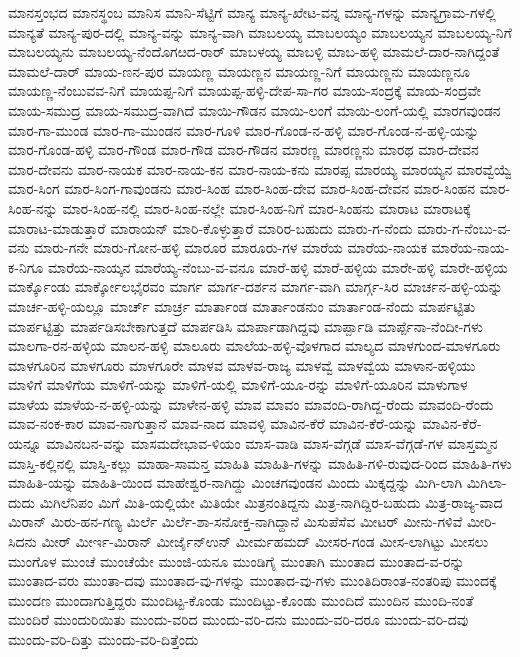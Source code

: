 {ಮಾನಸ್ತಂಭದ
ಮಾನಸ್ಥಂಬ
ಮಾನಿಸ
ಮಾನಿ-ಸೆಟ್ಟಿಗೆ
ಮಾನ್ಯ
ಮಾನ್ಯ-ಖೇಟ-ವನ್ನ
ಮಾನ್ಯ-ಗಳನ್ನು
ಮಾನ್ಯಗ್ರಾಮ-ಗಳಲ್ಲಿ
ಮಾನ್ಯತೆ
ಮಾನ್ಯ-ಪುರ-ದಲ್ಲಿ
ಮಾನ್ಯ-ವನ್ನು
ಮಾನ್ಯ-ವಾಗಿ
ಮಾಬಲಯ್ಯ
ಮಾಬಲಯ್ಯಂ
ಮಾಬಲಯ್ಯನ
ಮಾಬಲಯ್ಯ-ನಿಗೆ
ಮಾಬಲಯ್ಯನು
ಮಾಬಲಯ್ಯ-ನೆಂದೊಗೞದ-ರಾರ್
ಮಾಬಳಯ್ಯ
ಮಾಬಳ್ಳಿ
ಮಾಬ-ಹಳ್ಳಿ
ಮಾಮಲೆ-ದಾರ-ನಾಗಿದ್ದಂತೆ
ಮಾಮಲೆ-ದಾರ್
ಮಾಯ-ಣನ-ಪುರ
ಮಾಯಣ್ಣ
ಮಾಯಣ್ಣನ
ಮಾಯಣ್ಣ-ನಿಗೆ
ಮಾಯಣ್ಣನು
ಮಾಯಣ್ಣನೂ
ಮಾಯಣ್ಣ-ನೆಂಬುವವ-ನಿಗೆ
ಮಾಯಪ್ಪ-ನಿಗೆ
ಮಾಯಪ್ಪ-ಹಳ್ಳಿ-ದೇಪ-ಸಾ-ಗರ
ಮಾಯ-ಸಂದ್ರಕ್ಕೆ
ಮಾಯ-ಸಂದ್ರವೇ
ಮಾಯ-ಸಮುದ್ರ
ಮಾಯ-ಸಮುದ್ರ-ವಾಗಿದೆ
ಮಾಯಿ-ಗೌಡನ
ಮಾಯಿ-ಲಂಗೆ
ಮಾಯಿ-ಲಂಗೆ-ಯಲ್ಲಿ
ಮಾರಗವುಂಡನ
ಮಾರ-ಗಾ-ಮುಂಡ
ಮಾರ-ಗಾ-ಮುಂಡನ
ಮಾರ-ಗೂಳಿ
ಮಾರ-ಗೊಂಡ-ನ-ಹಳ್ಳಿ
ಮಾರ-ಗೊಂಡ-ನ-ಹಳ್ಳಿ-ಯನ್ನು
ಮಾರ-ಗೊಂಡ-ಹಳ್ಳಿ
ಮಾರ-ಗೌಂಡ
ಮಾರ-ಗೌಡ
ಮಾರ-ಗೌಡನ
ಮಾರಣ್ಣ
ಮಾರಣ್ಣನು
ಮಾರಥ
ಮಾರ-ದೇವನ
ಮಾರ-ದೇವನು
ಮಾರ-ನಾಯಕ
ಮಾರ-ನಾಯ-ಕನ
ಮಾರ-ನಾಯ-ಕನು
ಮಾರಪ್ಪ
ಮಾರಯ್ಯ
ಮಾರಯ್ಯನ
ಮಾರವ್ವೆಯ್ವೆ
ಮಾರ-ಸಿಂಗ
ಮಾರ-ಸಿಂಗ-ಗಾವುಂಡನು
ಮಾರ-ಸಿಂಹ
ಮಾರ-ಸಿಂಹ-ದೇವ
ಮಾರ-ಸಿಂಹ-ದೇವನ
ಮಾರ-ಸಿಂಹನ
ಮಾರ-ಸಿಂಹ-ನನ್ನು
ಮಾರ-ಸಿಂಹ-ನಲ್ಲಿ
ಮಾರ-ಸಿಂಹ-ನಲ್ಲೇ
ಮಾರ-ಸಿಂಹ-ನಿಗೆ
ಮಾರ-ಸಿಂಹನು
ಮಾರಾಟ
ಮಾರಾಟಕ್ಕೆ
ಮಾರಾಟ-ಮಾಡುತ್ತಾರೆ
ಮಾರಾಯನ್
ಮಾರಿ-ಕೊಳ್ಳುತ್ತಾರೆ
ಮಾರಿರ-ಬಹುದು
ಮಾರು-ಗ-ನೆಂದು
ಮಾರು-ಗ-ನೆಂಬು-ವ-ವನು
ಮಾರು-ಗನೇ
ಮಾರು-ಗೋನ-ಹಳ್ಳಿ
ಮಾರೂರ
ಮಾರೂರು-ಗಳ
ಮಾರೆಯ
ಮಾರೆಯ-ನಾಯಕ
ಮಾರೆಯ-ನಾಯ-ಕ-ನಿಗೂ
ಮಾರೆಯ-ನಾಯ್ಕನ
ಮಾರೆಯ್ಯ-ನೆಂಬು-ವ-ವನೂ
ಮಾರೆ-ಹಳ್ಳಿ
ಮಾರೆ-ಹಳ್ಳಿಯ
ಮಾರೇ-ಹಳ್ಳಿ
ಮಾರೇ-ಹಳ್ಳಿಯ
ಮಾರ್ಕ್ಕೊಂಡು
ಮಾರ್ಕ್ಕೋಲಭೈರವಂ
ಮಾರ್ಗ
ಮಾರ್ಗ-ದರ್ಶನ
ಮಾರ್ಗ-ವಾಗಿ
ಮಾರ್ಗ್ಗ-ಸಿರ
ಮಾರ್ಚನ-ಹಳ್ಳಿ-ಯನ್ನು
ಮಾರ್ಚ-ಹಳ್ಳಿ-ಯಲ್ಲೂ
ಮಾರ್ಚ್
ಮಾರ್ಚ್ರ
ಮಾರ್ತಾಂಡ
ಮಾರ್ತಾಂಡನುಂ
ಮಾರ್ತಾಂಡ-ನೆಂದು
ಮಾರ್ಪಟ್ಟಿತು
ಮಾರ್ಪಟ್ಟಿತ್ತು
ಮಾರ್ಪಡಿಸಬೇಕಾಗುತ್ತದೆ
ಮಾರ್ಪಡಿಸಿ
ಮಾರ್ಪಾಡಾಗಿದ್ದವು
ಮಾರ್ಪ್ಪಾಡಿ
ಮಾರ್ಪ್ಪೆನಾ-ನೆಂದೀ-ಗಳು
ಮಾಲಗಾ-ರನ-ಹಳ್ಳಿಯ
ಮಾಲನ-ಹಳ್ಳಿ
ಮಾಲೂರು
ಮಾಲೆಯ-ಹಳ್ಳಿ-ವೊಳಗಾದ
ಮಾಲ್ಯದ
ಮಾಳಗುಂದ-ಮಾಳಗೂರು
ಮಾಳಗೂರಿನ
ಮಾಳಗೂರು
ಮಾಳಗೂರೇ
ಮಾಳವ
ಮಾಳವ-ರಾಜ್ಯ
ಮಾಳವ್ವೆ
ಮಾಳವ್ವೆಯ
ಮಾಳಾನ-ಹಳ್ಳಿಯು
ಮಾಳಿಗೆ
ಮಾಳಿಗೆಯ
ಮಾಳಿಗೆ-ಯನ್ನು
ಮಾಳಿಗೆ-ಯಲ್ಲಿ
ಮಾಳಿಗೆ-ಯೂ-ರನ್ನು
ಮಾಳಿಗೆ-ಯೂರಿನ
ಮಾಳುಗಾಳ
ಮಾಳೆಯ
ಮಾಳೆಯ-ನ-ಹಳ್ಳಿ-ಯನ್ನು
ಮಾಳೇನ-ಹಳ್ಳಿ
ಮಾವ
ಮಾವಂ
ಮಾವಂದಿ-ರಾಗಿದ್ದ-ರೆಂದು
ಮಾವಂದಿ-ರೆಂದು
ಮಾವ-ನಂಕ-ಕಾರ
ಮಾವ-ನಾಗುತ್ತಾನೆ
ಮಾವ-ನಾದ
ಮಾವಳ್ಳಿ
ಮಾವಿನ-ಕೆರೆ
ಮಾವಿನ-ಕೆರೆ-ಯನ್ನು
ಮಾವಿನ-ಕೆರೆ-ಯನ್ನೂ
ಮಾವಿನಬನ-ವನ್ನು
ಮಾಸಮದೇಭಾವ-ಳಿಯಂ
ಮಾಸ-ವಾಡಿ
ಮಾಸ-ವೆಗ್ಗಡೆ
ಮಾಸ-ವೆಗ್ಗಡೆ-ಗಳ
ಮಾಸ್ತಮ್ಮನ
ಮಾಸ್ತಿ-ಕಲ್ಲಿನಲ್ಲಿ
ಮಾಸ್ತಿ-ಕಲ್ಲು
ಮಾಹಾ-ಸಾಮನ್ತ
ಮಾಹಿತಿ
ಮಾಹಿತಿ-ಗಳನ್ನು
ಮಾಹಿತಿ-ಗಳಿ-ರುವುದ-ರಿಂದ
ಮಾಹಿತಿ-ಗಳು
ಮಾಹಿತಿ-ಯನ್ನು
ಮಾಹಿತಿ-ಯಿಂದ
ಮಾಹೇಶ್ವರ-ನಾಗಿದ್ದು
ಮಿಂಚಗವುಂಡನ
ಮಿಂದು
ಮಿಕ್ಕದ್ದನ್ನು
ಮಿಗಿ-ಲಾಗಿ
ಮಿಗಿಲಾ-ದುದು
ಮಿಗಿಲೆನಿಪಂ
ಮಿಗೆ
ಮಿತಿ-ಯಲ್ಲಿಯೇ
ಮಿತಿಯೇ
ಮಿತ್ರನಂತಿದ್ದನು
ಮಿತ್ರ-ನಾಗಿದ್ದಿರ-ಬಹುದು
ಮಿತ್ರ-ರಾಜ್ಯ-ವಾದ
ಮಿರಾನ್
ಮಿರು-ಹನ-ಗಣ್ಯ
ಮಿರ್ಲೆ
ಮಿರ್ಲೆ-ಶಾ-ಸನೋಕ್ತ-ನಾಗಿದ್ದಾನೆ
ಮಿಸುಪೆಸೆವ
ಮೀಟರ್
ಮೀನು-ಗಳಿವೆ
ಮೀರಿ-ಸಿದನು
ಮೀರ್
ಮೀರ್ಇ-ಮಿರಾನ್
ಮೀರ್ಜೈನ್ಉನ್
ಮೀರ್ಮಹಮದ್
ಮೀಸರ-ಗಂಡ
ಮೀಸ-ಲಾಗಿಟ್ಟು
ಮೀಸಲು
ಮುಂಗೊಳ
ಮುಂಚೆ
ಮುಂಚೆಯೇ
ಮುಂಜಿ-ಯನೂ
ಮುಂಡಿಗೈ
ಮುಂತಾಗಿ
ಮುಂತಾದ
ಮುಂತಾದ-ವ-ರನ್ನು
ಮುಂತಾದ-ವರು
ಮುಂತಾ-ದವು
ಮುಂತಾದ-ವು-ಗಳನ್ನು
ಮುಂತಾದ-ವು-ಗಳು
ಮುಂತಿದಿರಾಂತ-ನಂತರಿಪು
ಮುಂದಕ್ಕೆ
ಮುಂದಣ
ಮುಂದಾಗುತ್ತಿದ್ದರು
ಮುಂದಿಟ್ಟ-ಕೊಂಡು
ಮುಂದಿಟ್ಟು-ಕೊಂಡು
ಮುಂದಿದೆ
ಮುಂದಿನ
ಮುಂದಿ-ನಂತೆ
ಮುಂದಿರೆ
ಮುಂದುರಿಯಿತು
ಮುಂದು-ವರಿದ
ಮುಂದು-ವರಿ-ದನು
ಮುಂದು-ವರಿ-ದರೂ
ಮುಂದು-ವರಿ-ದವು
ಮುಂದು-ವರಿ-ದಿತ್ತು
ಮುಂದು-ವರಿ-ದಿತ್ತೆಂದು
}
